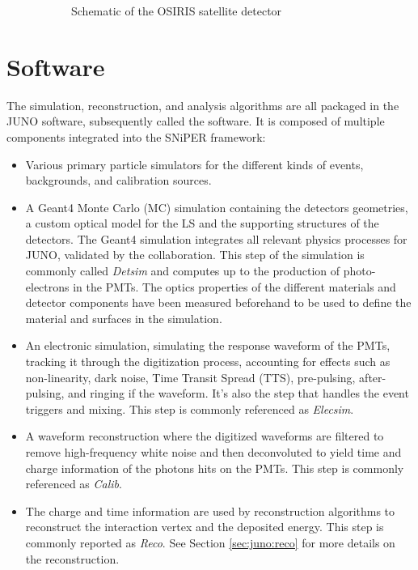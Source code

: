 \documentclass[../main.tex]{subfiles}
\begin{document}
\begin{figure}[ht]
\begin{subfigure}[t]{0.49\linewidth}
    \caption{Schematic of the OSIRIS satellite detector}
    \label{fig:juno:osiris}
  \end{subfigure}
  \caption{}
\end{figure}

\section{Software}
\label{sec:juno:software}

The simulation, reconstruction, and analysis algorithms are all packaged in the JUNO software, subsequently called the software.
It is composed of multiple components integrated into the SNiPER \cite{lin_application_2017} framework:

\begin{itemize}
  \item Various primary particle simulators for the different kinds of events, backgrounds, and calibration sources.
  \item A Geant4 \cite{agostinelli_geant4simulation_2003, allison_geant4_2006, allison_recent_2016} Monte Carlo (MC) simulation containing the detectors geometries, a custom optical model for the LS and the supporting structures of the detectors. The Geant4 simulation integrates all relevant physics processes for JUNO, validated by the collaboration. This step of the simulation is commonly called \textit{Detsim} and computes up to the production of photo-electrons in the PMTs. The optics properties of the different materials and detector components have been measured beforehand to be used to define the material and surfaces in the simulation.
  \item An electronic simulation, simulating the response waveform of the PMTs, tracking it through the digitization process, accounting for effects such as non-linearity, dark noise, Time Transit Spread (TTS), pre-pulsing, after-pulsing, and ringing if the waveform. It's also the step that handles the event triggers and mixing. This step is commonly referenced as \textit{Elecsim}.
  \item A waveform reconstruction where the digitized waveforms are filtered to remove high-frequency white noise and then deconvoluted to yield time and charge information of the photons hits on the PMTs. This step is commonly referenced as \textit{Calib}.
  \item The charge and time information are used by reconstruction algorithms to reconstruct the interaction vertex and the deposited energy. This step is commonly reported as \textit{Reco}. See Section \ref{sec:juno:reco} for more details on the reconstruction.

\end{itemize}
\end{document}
